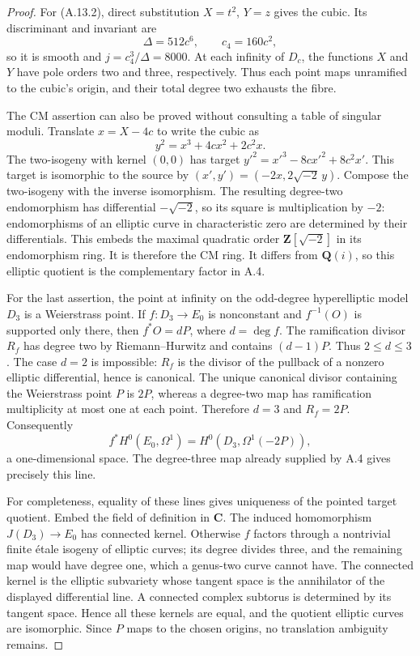 \begin{proof}
For (A.13.2), direct substitution $X=t^2$, $Y=z$ gives the cubic.
Its discriminant and invariant are
\[
                       \Delta=512c^6,\qquad c_4=160c^2,
\]
so it is smooth and $j=c_4^3/\Delta=8000$. At each infinity
of $D_c$, the functions $X$ and $Y$ have pole orders two and
three, respectively. Thus each point maps unramified to the
cubic's origin, and their total degree two exhausts the fibre.

The CM assertion can also be proved without consulting a table
of singular moduli. Translate $x=X-4c$ to write the cubic as
\[
                         y^2=x^3+4cx^2+2c^2x.
\]
The two-isogeny with kernel $(0,0)$ has target
$y'^2=x'^3-8cx'^2+8c^2x'$. This target is isomorphic to the
source by $(x',y')=(-2x,2\sqrt{-2}\,y)$.
Compose the two-isogeny with the inverse isomorphism. The resulting
degree-two endomorphism has differential $-\sqrt{-2}$, so its
square is multiplication by $-2$: endomorphisms of an elliptic
curve in characteristic zero are determined by their differentials.
This embeds the maximal quadratic order $\mathbf Z[\sqrt{-2}]$
in its endomorphism ring. It is therefore the CM ring.
It differs from $\mathbf Q(i)$, so this elliptic quotient is
the complementary factor in A.4.

For the last assertion, the point at infinity on the odd-degree
hyperelliptic model $D_3$ is a Weierstrass point. If
$f:D_3\to E_0$ is nonconstant and $f^{-1}(O)$ is supported
only there, then $f^*O=dP$, where $d=\deg f$. The ramification
divisor $R_f$ has degree two by Riemann--Hurwitz and contains
$(d-1)P$. Thus $2\le d\le3$. The case $d=2$ is impossible:
$R_f$ is the divisor of the pullback of a nonzero elliptic
differential, hence is canonical. The unique canonical divisor
containing the Weierstrass point $P$ is $2P$, whereas a
degree-two map has ramification multiplicity at most one at
each point. Therefore $d=3$ and $R_f=2P$.
Consequently
\[
                 f^*H^0(E_0,\Omega^1)=H^0(D_3,\Omega^1(-2P)),
\]
a one-dimensional space. The degree-three map already supplied
by A.4 gives precisely this line.

For completeness, equality of these lines gives uniqueness of
the pointed target quotient. Embed the field of definition in
$\mathbf C$. The induced homomorphism
$J(D_3)\to E_0$ has connected kernel. Otherwise $f$ factors
through a nontrivial finite étale isogeny of elliptic curves;
its degree divides three, and the remaining map would have
degree one, which a genus-two curve cannot have. The connected
kernel is the elliptic subvariety whose tangent space is the
annihilator of the displayed differential line. A connected
complex subtorus is determined by its tangent space. Hence all
these kernels are equal, and the quotient elliptic curves are
isomorphic. Since $P$ maps to the chosen origins, no translation
ambiguity remains.


\end{proof}
